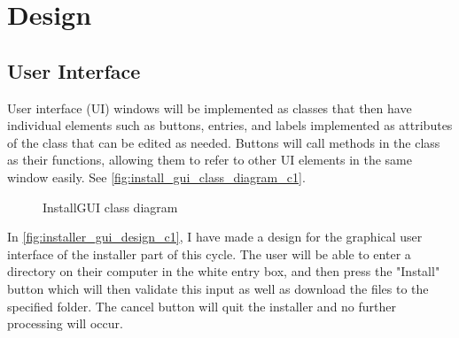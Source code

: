 \section{Design}

    \subsection{User Interface}
        User interface (UI) windows will be implemented as classes that then have individual elements such as buttons, entries, and labels implemented as attributes of the class that can be edited as needed. Buttons will call methods in the class as their functions, allowing them to refer to other UI elements in the same window easily. See \autoref{fig:install_gui_class_diagram_c1}.

        \begin{figure}[!ht]
            \centering
            \caption{InstallGUI class diagram}
            \label{fig:install_gui_class_diagram_c1}
        \end{figure}

        In \autoref{fig:installer_gui_design_c1}, I have made a design for the graphical user interface of the installer part of this cycle. The user will be able to enter a directory on their computer in the white entry box, and then press the "Install" button which will then validate this input as well as download the files to the specified folder. The cancel button will quit the installer and no further processing will occur.

